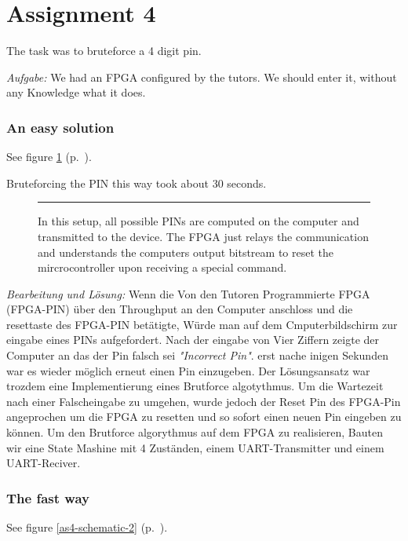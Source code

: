 \section*{Assignment 4}
The task was to bruteforce a 4 digit pin.

\emph{Aufgabe: }We had an FPGA configured by the tutors. We should enter it, without any Knowledge what it does.

\subsubsection*{An easy solution}
See figure \ref{as4-schematic-1} (p.~\pageref{as4-schematic-1}).

Bruteforcing the PIN this way took about 30 seconds.

\begin{figure}[tb]
    \begin{center}
        
        \caption{In this setup, all possible PINs are computed on the computer and transmitted to the device. The FPGA just relays the communication and understands the computers output bitstream to reset the mircrocontroller upon receiving a special command.}
        \label{as4-schematic-1}
        \vspace{1em}\hrule
    \end{center}
\end{figure}

\emph{Bearbeitung und Lösung: }Wenn die Von den Tutoren Programmierte FPGA (FPGA-PIN) über den Throughput an den Computer anschloss und die resettaste des FPGA-PIN betätigte, Würde man auf dem Cmputerbildschirm zur eingabe eines PINs aufgefordert. Nach der eingabe von Vier Ziffern zeigte der Computer an das der Pin falsch sei \emph{"Incorrect Pin"}. erst nache inigen Sekunden war es wieder möglich erneut einen Pin einzugeben. 
Der Lösungsansatz war trozdem eine Implementierung eines Brutforce algotythmus. Um die Wartezeit nach einer Falscheingabe zu umgehen, wurde jedoch der Reset Pin des FPGA-Pin angeprochen um die FPGA zu resetten und so sofort einen neuen Pin eingeben zu können. 
Um den Brutforce algorythmus auf dem FPGA zu realisieren, Bauten wir eine State Mashine mit 4 Zuständen, einem UART-Transmitter und einem UART-Reciver.

\subsubsection*{The fast way}
See figure \ref{as4-schematic-2} (p.~\pageref{as4-schematic-2}).

